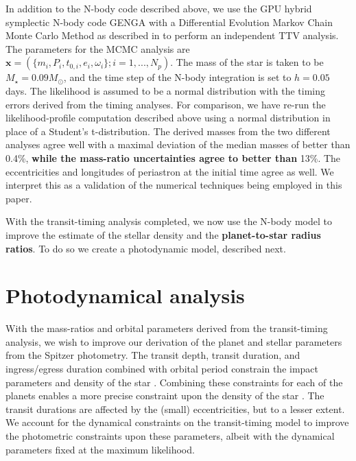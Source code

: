 \documentclass[twocolumn]{aastex63}
\begin{document}
In addition to the N-body code described above, we use the GPU hybrid symplectic N-body code GENGA \citep{Grimm2014} with a Differential Evolution Markov Chain Monte Carlo Method  \citep[DEMCMC;][]{terBraak2006} as described in \citet{Grimm2018} to perform an independent TTV analysis. The parameters for the MCMC analysis are $\mathbf{x} = (\{m_i, P_i,t_{0,i},e_i,\omega_i\};i=1,...,N_p)$. The mass of the star is taken to be $M_{\star} = 0.09 M_{\odot}$, and the time step of the N-body integration is set to $h=0.05$ days.  The
likelihood is assumed to be a normal distribution with the timing errors derived from
the timing analyses.  For comparison, we have re-run the likelihood-profile
computation described above using a normal distribution in place of a Student's t-distribution.
The derived masses from the two different analyses agree well with a maximal deviation of the median masses of better than 0.4\%, \textbf{while the mass-ratio uncertainties agree to better than} 13\%.  The eccentricities and longitudes of periastron at the initial time agree as well.  We interpret this as a validation of the numerical techniques being employed in this paper.

With the transit-timing analysis completed, we now use the N-body model to improve the estimate of the stellar density and the \textbf{planet-to-star radius ratios}.  To do so we create a photodynamic model, described next.

\section{Photodynamical analysis}\label{sec:photodynamics}

With the mass-ratios and orbital parameters derived from the transit-timing
analysis, we wish to improve our derivation of the planet and stellar parameters
from the Spitzer photometry.   The transit depth, transit duration, and ingress/egress
duration combined with  orbital period constrain the impact parameters and density
of the star \citep{Seager2003}.  Combining these constraints for
each of the planets  enables a more precise constraint upon the density of the
star \citep{Kipping2012a}.
The transit durations are affected by the (small) eccentricities, but to a lesser extent.  We account
for the dynamical constraints on the transit-timing model to improve the
photometric constraints upon these parameters, albeit with the dynamical parameters fixed
at the maximum likelihood.
\end{document}
